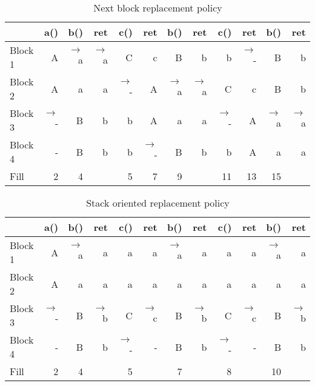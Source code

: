 \begin{table}[t]
    \centering
\begin{tt}
    \begin{tabular}{lrrrrrrrrrrr}
    \toprule

                &a()    &b()    &ret    &c()    &ret    &b()    &ret    &c()    &ret    &b()    &ret    \\
    \midrule
    \rm{Block 1}&A      &$\to$a &$\to$a &C      &c      &B      &b      &b      &$\to$- &B      &b      \\
    \rm{Block 2}&A      &a      &a      &$\to$- &A      &$\to$a &$\to$a &C      &c      &B      &b      \\
    \rm{Block 3}&$\to$- &B      &b      &b      &A      &a      &a      &$\to$- &A      &$\to$a &$\to$a \\
    \rm{Block 4}&-      &B      &b      &b      &$\to$- &B      &b      &b      &A      &a      &a      \\
    \midrule
    \rm{Fill}      &2   &4      &       &5      &7      &9      &       &11     &13     &15     &       \\
    \bottomrule

    \end{tabular}
\end{tt}
    \caption{Next block replacement policy}
    \label{tab_cache_replace_next}
\end{table}

\begin{table}
    \centering
\begin{tt}
    \begin{tabular}{lrrrrrrrrrrr}
    \toprule

                &a()    &b()    &ret    &c()    &ret    &b()    &ret    &c()    &ret    &b()    &ret    \\
    \midrule
    \rm{Block 1}&A      &$\to$a &a      &a      &a      &$\to$a &a      &a      &a      &$\to$a &a      \\
    \rm{Block 2}&A      &a      &a      &a      &a      &a      &a      &a      &a      &a      &a      \\
    \rm{Block 3}&$\to$- &B      &$\to$b &C      &$\to$c &B      &$\to$b &C      &$\to$c &B      &$\to$b \\
    \rm{Block 4}&-      &B      &b      &$\to$- &-      &B      &b      &$\to$- &-      &B      &b      \\
    \midrule
    \rm{Fill}      &2   &4      &       &5      &       &7      &       &8      &       &10     &       \\
    \bottomrule

    \end{tabular}
\end{tt}
    \caption{Stack oriented replacement policy}
    \label{tab_cache_replace_stack}
\end{table}

